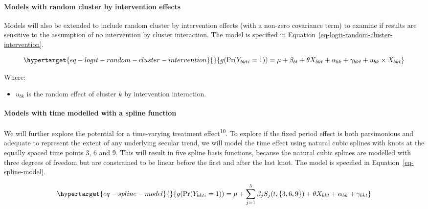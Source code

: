 \documentclass[
]{scrartcl}
\let\oldparagraph\paragraph
\renewcommand{\paragraph}[1]{\oldparagraph{#1}\mbox{}}
\providecommand{\tightlist}{%
  \setlength{\itemsep}{0pt}\setlength{\parskip}{0pt}}\usepackage{longtable,booktabs,array}
\begin{document}
\hypertarget{models-with-random-cluster-by-intervention-effects}{%
\paragraph{Models with random cluster by intervention
effects}\label{models-with-random-cluster-by-intervention-effects}}

Models will also be extended to include random cluster by intervention
effects (with a non-zero covariance term) to examine if results are
sensitive to the assumption of no intervention by cluster interaction.
The model is specified in
Equation~\ref{eq-logit-random-cluster-intervention}.

\begin{equation}\protect\hypertarget{eq-logit-random-cluster-intervention}{}{
g(\text{Pr}(Y_{bkti} = 1)) = \mu + \beta_{bt} + \theta X_{bkt} + \alpha_{bk} + \gamma_{bkt} + u_{bk} \times X_{bkt}
}\label{eq-logit-random-cluster-intervention}\end{equation}

Where:

\begin{itemize}
\tightlist
\item
  \(u_{bk}\) is the random effect of cluster \(k\) by intervention
  interaction.
\end{itemize}

\hypertarget{models-with-time-modelled-with-a-spline-function}{%
\paragraph{Models with time modelled with a spline
function}\label{models-with-time-modelled-with-a-spline-function}}

We will further explore the potential for a time-varying treatment
effect\textsuperscript{10}. To explore if the fixed period effect is
both parsimonious and adequate to represent the extent of any underlying
secular trend, we will model the time effect using natural cubic splines
with knots at the equally spaced time points 3, 6 and 9. This will
result in five spline basis functions, because the natural cubic splines
are modelled with three degrees of freedom but are constrained to be
linear before the first and after the last knot. The model is specified
in Equation~\ref{eq-spline-model}.

\begin{equation}\protect\hypertarget{eq-spline-model}{}{
g(\text{Pr}(Y_{bkti} = 1)) = \mu + \sum_{j=1}^5 \beta_j S_j(t, \{3, 6, 9\}) + \theta X_{bkt} + \alpha_{bk} + \gamma_{bkt}
}\label{eq-spline-model}\end{equation}
\end{document}
